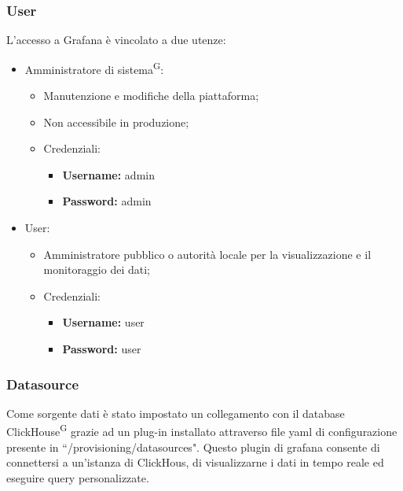 \documentclass[8pt]{article}
\newcommand{\glossterm}[1]{#1\textsuperscript{G}} %
\begin{document}
\subsubsection{User}
L’accesso a Grafana è vincolato a due utenze:
\begin{itemize}
    \item Amministratore di \glossterm{sistema}: 
    \begin{itemize}
        \item Manutenzione e modifiche della piattaforma;
        \item Non accessibile in produzione;
        \item Credenziali:
        \begin{itemize}
            \item \textbf{Username:} admin
            \item \textbf{Password:} admin
        \end{itemize}
    \end{itemize}
    \item User: 
    \begin{itemize}
        \item Amministratore pubblico o autorità locale per la visualizzazione e il monitoraggio dei dati;
        \item Credenziali:
        \begin{itemize}
            \item \textbf{Username:} user
            \item \textbf{Password:} user
        \end{itemize}
    \end{itemize}
\end{itemize}
\subsubsection{Datasource}
Come sorgente dati è stato impostato un collegamento con il database \glossterm{ClickHouse} grazie ad un plug-in installato attraverso file yaml di configurazione presente in ``/provisioning/datasources". Questo plugin di grafana consente di connettersi a un’istanza di ClickHous, di visualizzarne i dati in tempo reale ed eseguire query personalizzate.
\end{document}
